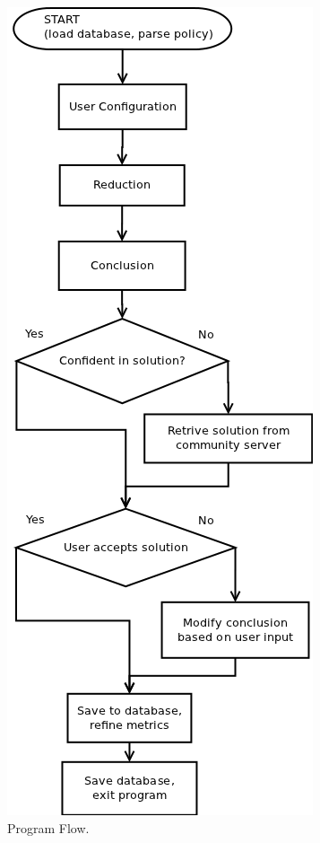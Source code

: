 \begin{figure}[htbp]
\begin{center}
\includegraphics[width = 0.57G \textwidth ]{DesignReport/uml/flowchart.png}
\caption{Program Flow.}
\label{DesignFlowChart}
\end{center}
\end{figure}


